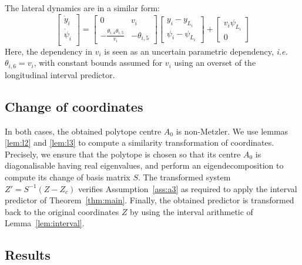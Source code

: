 \documentclass[letterpaper, 10 pt, conference]{ieeeconf}
\theoremstyle{plain}
\theoremstyle{definition}
\theoremstyle{plain}
\theoremstyle{plain}
\theoremstyle{remark}
\begin{document}
The lateral dynamics are in a similar form:
\begin{equation*}
\begin{bmatrix}
\dot{y}_i \\
\dot{\psi}_i \\
\end{bmatrix}
=
\begin{bmatrix}
0 & v_i \\
-\frac{\theta_{i,4} \theta_{i,5}}{v_i} & -\theta_{i,5}
\end{bmatrix}
\begin{bmatrix}
y_i - y_{L_i} \\
\psi_i - \psi_{L_i}
\end{bmatrix}
+
\begin{bmatrix}
v_i\psi_{L_i} \\
0
\end{bmatrix}
\end{equation*}
Here, the dependency in $v_i$ is seen as an uncertain parametric dependency, \emph{i.e.} $\theta_{i,6}=v_i$, with constant bounds assumed for $v_i$ using an overset of the longitudinal interval predictor.

\subsection{Change of coordinates}
In both cases, the obtained polytope centre $A_0$ is non-Metzler.
We use lemmas \ref{lem:l2} and \ref{lem:l3} to compute a similarity transformation of coordinates. Precisely, we ensure that the polytope is chosen so that its centre $A_0$ is diagonalisable having real eigenvalues, and perform an eigendecomposition to compute its change of basis matrix $S$. The transformed system $Z'=S^{-1}(Z-Z_c)$ verifies Assumption~\ref{ass:a3} as required to apply the interval predictor of Theorem~\ref{thm:main}. Finally, the obtained predictor is transformed back to the original coordinates $Z$ by using the interval arithmetic of Lemma~\ref{lem:interval}.

\subsection{Results}
\end{document}

